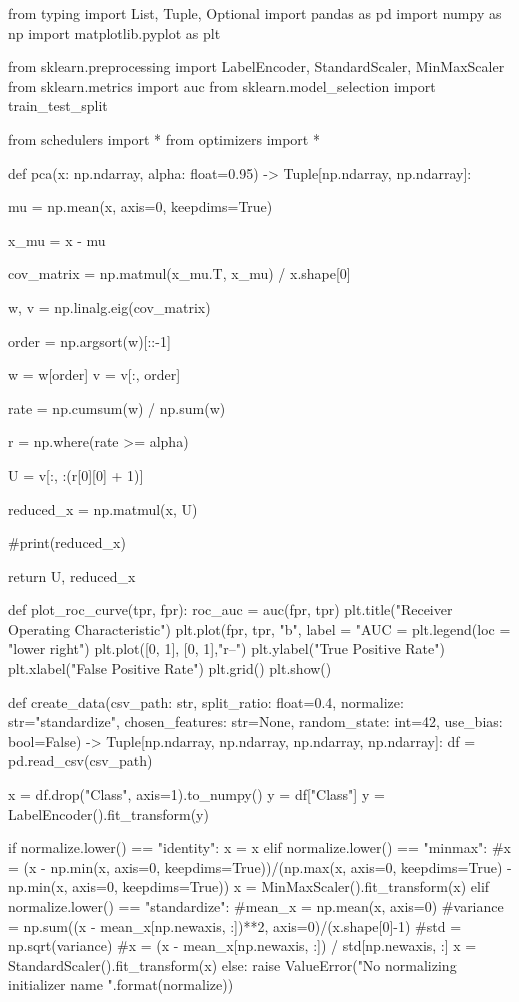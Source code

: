 \documentclass[14pt, a4paper]{article}
\theoremstyle{sltheorem}
\theoremstyle{soltheorem}
\begin{document}
\begin{python}
from typing import List, Tuple, Optional
import pandas as pd
import numpy as np
import matplotlib.pyplot as plt

from sklearn.preprocessing import LabelEncoder, StandardScaler, MinMaxScaler
from sklearn.metrics import auc
from sklearn.model_selection import train_test_split

from schedulers import *
from optimizers import *


def pca(x: np.ndarray, alpha: float=0.95) -> Tuple[np.ndarray, np.ndarray]:
    
    mu = np.mean(x, axis=0, keepdims=True)

    x_mu = x - mu

    cov_matrix = np.matmul(x_mu.T, x_mu) / x.shape[0]

    w, v = np.linalg.eig(cov_matrix)

    order = np.argsort(w)[::-1]

    w = w[order]
    v = v[:, order]

    rate = np.cumsum(w) / np.sum(w)

    r = np.where(rate >= alpha)

    U = v[:, :(r[0][0] + 1)]

    reduced_x = np.matmul(x, U)

    #print(reduced_x)

    return U, reduced_x

def plot_roc_curve(tpr, fpr):
    roc_auc = auc(fpr, tpr)
    plt.title("Receiver Operating Characteristic")
    plt.plot(fpr, tpr, "b", label = "AUC = %
    plt.legend(loc = "lower right")
    plt.plot([0, 1], [0, 1],"r--")
    plt.ylabel("True Positive Rate")
    plt.xlabel("False Positive Rate")
    plt.grid()
    plt.show()


def create_data(csv_path: str, split_ratio: float=0.4, normalize: str="standardize", chosen_features: str=None, random_state: int=42, use_bias: bool=False) -> Tuple[np.ndarray, np.ndarray, np.ndarray, np.ndarray]:
    df = pd.read_csv(csv_path)
    
    x = df.drop("Class", axis=1).to_numpy()
    y = df["Class"]
    y = LabelEncoder().fit_transform(y)
    
    if normalize.lower() == "identity":
        x = x
    elif normalize.lower() == "minmax":
        #x = (x - np.min(x, axis=0, keepdims=True))/(np.max(x, axis=0, keepdims=True) - np.min(x, axis=0, keepdims=True))
        x = MinMaxScaler().fit_transform(x)
    elif normalize.lower() == "standardize":
        #mean_x = np.mean(x, axis=0)
        #variance = np.sum((x - mean_x[np.newaxis, :])**2, axis=0)/(x.shape[0]-1)
        #std = np.sqrt(variance)
        #x = (x - mean_x[np.newaxis, :]) / std[np.newaxis, :]
        x = StandardScaler().fit_transform(x)
    else:
        raise ValueError("No normalizing initializer name {}".format(normalize))
    

\end{python}
\end{document}
